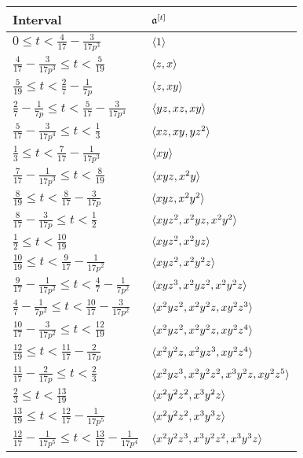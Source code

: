 \documentclass{amsart}
\begin{document}
\begin{example}
\begin{table}
\begin{center}
      \begin{tabular}{ll}
        \toprule
        Interval & $\mathfrak{a}^{[t]}$\\
        \midrule
        $0 \le t < \frac{4}{17} - \frac{3}{17 p^3}$ & $\langle 1 \rangle$ \\
        $\frac{4}{17} - \frac{3}{17 p^3} \le t < \frac5{19}$ & $\langle z, x \rangle$ \\
        $\frac5{19} \le t < \frac27 - \frac1{7 p}$ & $\langle z, xy \rangle$ \\
        $\frac27 - \frac1{7 p} \le t < \frac5{17} - \frac3{17 p^4}$ & $\langle yz, xz, xy \rangle$ \\
        $\frac5{17} - \frac3{17 p^4} \le t < \frac13$ & $\langle xz, xy, yz^2 \rangle$ \\
        $\frac13 \le t < \frac7{17} - \frac1{17 p^3}$ & $\langle xy \rangle$ \\
        $\frac7{17} - \frac1{17 p^3} \le t < \frac8{19}$ & $\langle xyz, x^2y \rangle$ \\
        $\frac8{19} \le t < \frac8{17} - \frac3{17 p}$ & $\langle xyz, x^2y^2 \rangle$ \\
        $\frac8{17} - \frac3{17 p} \le t < \frac12$ & $\langle xyz^2, x^2yz, x^2y^2 \rangle$ \\
        $\frac12 \le t < \frac{10}{19}$ & $\langle xyz^2, x^2yz \rangle$ \\
        $\frac{10}{19} \le t < \frac9{17} - \frac1{17 p^2}$ & $\langle xyz^2, x^2y^2z \rangle$ \\
        $\frac9{17} - \frac1{17 p^2} \le t < \frac47 - \frac1{7 p^2}$ & $\langle xyz^3, x^2yz^2, x^2y^2z \rangle$ \\
        $\frac47 - \frac1{7 p^2} \le t < \frac{10}{17} - \frac3{17 p^2}$ & $\langle x^2yz^2, x^2y^2z, xy^2z^3 \rangle$ \\
        $\frac{10}{17} - \frac3{17 p^2} \le t < \frac{12}{19}$ & $\langle x^2yz^2, x^2y^2z, xy^2z^4 \rangle$ \\
        $\frac{12}{19} \le t < \frac{11}{17} - \frac2{17 p}$ & $\langle x^2y^2z, x^2yz^3, xy^2z^4 \rangle$ \\
        $\frac{11}{17} - \frac2{17 p} \le t < \frac23$ & $\langle x^2yz^3, x^2y^2z^2, x^3y^2z, xy^2z^5 \rangle$ \\
        $\frac23 \le t < \frac{13}{19}$ & $\langle x^2y^2z^2, x^3y^2z \rangle$ \\
        $\frac{13}{19} \le t < \frac{12}{17} - \frac1{17 p^5}$ & $\langle x^2y^2z^2, x^3y^3z \rangle$ \\
        $\frac{12}{17} - \frac1{17 p^5} \le t < \frac{13}{17} - \frac1{17 p^4}$ & $\langle x^2y^2z^3, x^3y^2z^2, x^3y^3z \rangle$ \\

\end{tabular}
\end{center}
\end{table}
\end{example}
\end{document}
